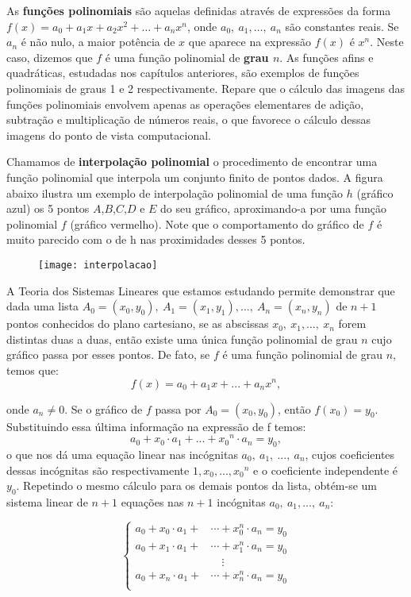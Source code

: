 As \textbf{funções polinomiais} são aquelas definidas através de expressões da forma $f(x) = a_0 + a_1x + a_2x^2 + \ldots +a_nx^n$, onde $a_0, \ a_1, \ldots , \ a_n$ são constantes reais. Se $a_n$ é não nulo, a maior potência de $x$ que aparece na expressão $f(x)$ é $x^n$. Neste caso, dizemos que $f$ é uma função polinomial de \textbf{grau $n$}. As funções afins e quadráticas, estudadas nos capítulos anteriores, são exemplos de funções polinomiais de graus 1 e 2 respectivamente. Repare que o cálculo das imagens das funções polinomiais envolvem apenas as operações elementares de adição, subtração e multiplicação de números reais, o que favorece o cálculo dessas imagens do ponto de vista computacional. 

Chamamos de \textbf{interpolação polinomial} o procedimento de encontrar uma função polinomial que interpola um conjunto finito de pontos dados. A figura abaixo ilustra um exemplo de interpolação polinomial de uma função $h$ (gráfico azul) os 5 pontos $A$,$B$,$C$,$D$ e $E$ do seu gráfico, aproximando-a por uma função polinomial $f$ (gráfico vermelho). Note que o comportamento do gráfico de $f$ é muito parecido com o de h nas proximidades desses 5 pontos.

\begin{figure}[H]
\centering
\noindent\texttt{[image: interpolacao]}
\end{figure}

A Teoria dos Sistemas Lineares que estamos estudando permite demonstrar que dada uma lista $A_0 = (x_0, y_0), \ A_1 = (x_1, y_1), \ldots ,\ A_n = (x_n, y_n)$ de $n+1$ pontos conhecidos do plano cartesiano, se as abscissas $x_0, \ x_1, \ldots , \ x_n$ forem distintas duas a duas, então existe uma única função polinomial de grau $n$ cujo gráfico passa por esses pontos. De fato, se $f$ é uma função polinomial de grau $n$, temos que:
$$
f(x) = a_0 + a_1x + ... + a_nx^n,
$$

onde $a_n \neq 0$. Se o gráfico de $f$ passa por $A_0 = (x_0,y_0)$, então $f(x_0) = y_0$. Substituindo essa última informação na expressão de f temos:
$$
a_0 + x_0\cdot a_1 + ... + {x_0}^n \cdot a_n = y_0,
$$
o que nos dá uma equação linear nas incógnitas $a_0, \ a_1, \ ..., \ a_n$, cujos coeficientes dessas incógnitas são respectivamente $1, x_0, \ldots, {x_0}^n$ e o coeficiente independente é $y_0$. Repetindo o mesmo cálculo para os demais pontos da lista, obtém-se um sistema linear de $n+1$ equações nas $n+1$ incógnitas $a_0, \ a_1, \ldots, \ a_n$:

\begin{equation*}
\left \{
\begin{aligned}
a_0+x_0\cdot a_1+&\cdots+x_0^n\cdot a_n=y_0\\
a_0+x_1\cdot a_1+&\cdots+x_1^n\cdot a_n=y_0\\
&\quad\vdots\\
a_0+x_n\cdot a_1+&\cdots+x_n^n\cdot a_n=y_0\\
\end{aligned}
\right.
\end{equation*}

